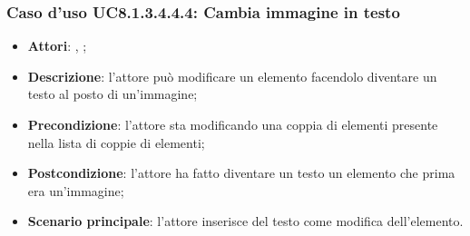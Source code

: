 		\subsubsection{Caso d'uso UC8.1.3.4.4.4: Cambia immagine in testo}
		\label{UC8.1.3.4.4.4}
		\begin{itemize}
			\item \textbf{Attori}: \uau, \uaupro;
			\item \textbf{Descrizione}: l'attore può modificare un elemento facendolo diventare un testo al posto di un'immagine;
			\item \textbf{Precondizione}: l'attore sta modificando una coppia di elementi presente nella lista di coppie di elementi; 
			\item \textbf{Postcondizione}: l'attore ha fatto diventare un testo un elemento che prima era un'immagine;
			\item \textbf{Scenario principale}: l'attore inserisce del testo come modifica dell'elemento.  
		\end{itemize}
		
